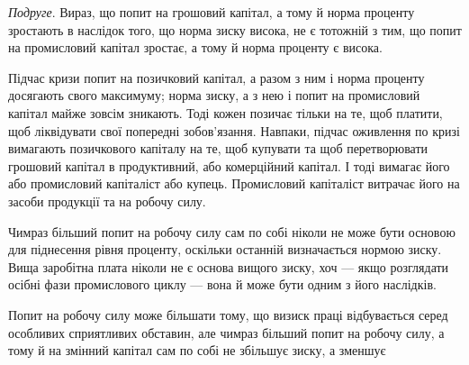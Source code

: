 \emph{Подруге}. Вираз, що попит на грошовий капітал, а тому й норма проценту
зростають в наслідок того, що норма зиску висока, не є тотожній з тим, що попит
на промисловий капітал зростає, а тому й норма проценту є висока.

Підчас кризи попит на позичковий капітал, а разом з ним і норма проценту
досягають свого максимуму; норма зиску, а з нею і попит на промисловий
капітал майже зовсім зникають. Тоді кожен позичає тільки на те, щоб
платити, щоб ліквідувати свої попередні зобов’язання. Навпаки, підчас оживлення
по кризі вимагають позичкового капіталу на те, щоб купувати та щоб перетворювати
грошовий капітал в продуктивний, або комерційний капітал. І тоді
вимагає його або промисловий капіталіст або купець. Промисловий капіталіст
витрачає його на засоби продукції та на робочу силу.

Чимраз більший попит на робочу силу сам по собі ніколи не може бути
основою для піднесення рівня проценту, оскільки останній визначається нормою
зиску. Вища заробітна плата ніколи не є основа вищого зиску, хоч — якщо
розглядати осібні фази промислового циклу — вона й може бути одним з його
наслідків.

Попит на робочу силу може більшати тому, що визиск праці відбувається
серед особливих сприятливих обставин, але чимраз більший попит на робочу
силу, а тому й на змінний капітал сам по собі не збільшує зиску, а зменшує
\parbreak{}  %
